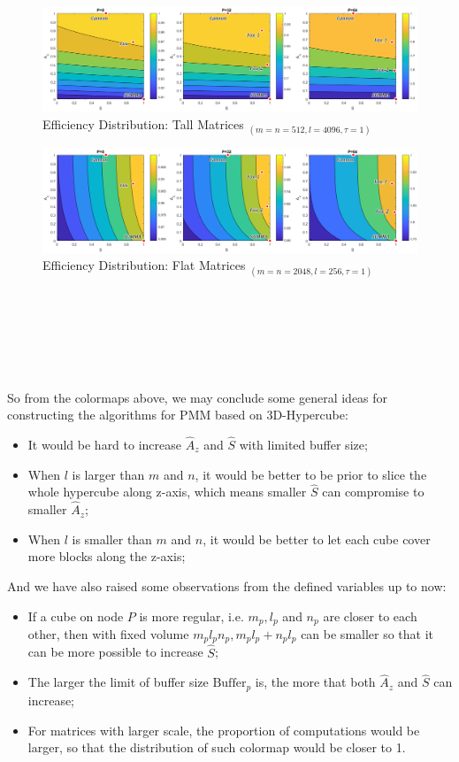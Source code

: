 \documentclass{amsart}
\theoremstyle{definition}
\theoremstyle{remark}
\numberwithin{equation}{section}
\begin{document}
\begin{figure}[h]
	\includegraphics[scale=0.35]{Figures/Tall.png}
	\caption{Efficiency Distribution: Tall Matrices $_{(m=n=512,l=4096,\tau=1)}$}
\end{figure}
\begin{figure}[h]
	\includegraphics[scale=0.35]{Figures/Flat.png}
	\caption{Efficiency Distribution: Flat Matrices $_{(m=n=2048,l=256,\tau=1)}$}
\end{figure}
~\\~\\~\\~\\~\\
\par
So from the colormaps above, we may conclude some general ideas for constructing the algorithms for PMM based on 3D-Hypercube:
\begin{itemize}
\item It would be hard to increase $\hat{A}_z$ and $\hat{S}$ with limited buffer size;
\item When $l$ is larger than $m$ and $n$, it would be better to be prior to slice the whole hypercube along z-axis, which means smaller $\hat{S}$ can compromise to smaller $\hat{A}_z$;
\item When $l$ is smaller than $m$ and $n$, it would be better to let each cube cover more blocks along the z-axis;\
\end{itemize}
\par
And we have also raised some observations from the defined variables up to now:
\begin{itemize}
\item If a cube on node $P$ is more regular, i.e. $m_p,l_p$ and $n_p$ are closer to each other, then with fixed volume $m_pl_pn_p, m_pl_p+n_pl_p$ can be smaller so that it can be more possible to increase $\hat{S}$;
\item The larger the limit of buffer size $\text{Buffer}_p$ is, the more that both $\hat{A}_z$ and $\hat{S}$ can increase;
\item For matrices with larger scale, the proportion of computations would be larger, so that the distribution of such colormap would be closer to 1.
\end{itemize}
\end{document}
